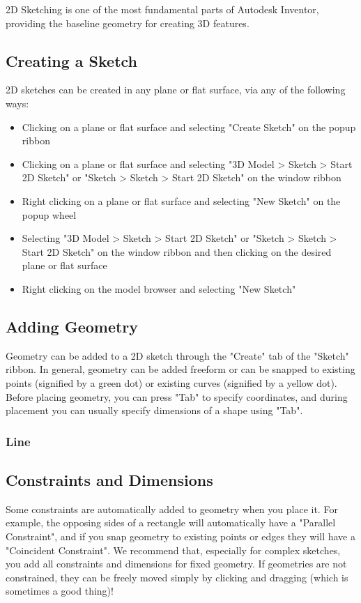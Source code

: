 \documentclass[a4paper,12pt]{report}
\begin{document}
2D Sketching is one of the most fundamental parts of Autodesk Inventor, providing the baseline geometry for creating 3D features. 

\subsection{Creating a Sketch}

2D sketches can be created in any plane or flat surface, via any of the following ways:

\begin{itemize}
\item Clicking on a plane or flat surface and selecting "Create Sketch" on the popup ribbon
\item Clicking on a plane or flat surface and selecting "3D Model > Sketch > Start 2D Sketch" or "Sketch > Sketch > Start 2D Sketch" on the window ribbon
\item Right clicking on a plane or flat surface and selecting "New Sketch" on the popup wheel
\item Selecting "3D Model > Sketch > Start 2D Sketch" or "Sketch > Sketch > Start 2D Sketch" on the window ribbon and then clicking on the desired plane or flat surface
\item Right clicking on the model browser and selecting "New Sketch"
\end{itemize}

\subsection{Adding Geometry}
Geometry can be added to a 2D sketch through the "Create" tab of the "Sketch" ribbon. In general, geometry can be added freeform or can be snapped to existing points (signified by a green dot) or existing curves (signified by a yellow dot). Before placing geometry, you can press "Tab" to specify coordinates, and during placement you can usually specify dimensions of a shape using "Tab". 
\subsubsection{Line}

\subsection{Constraints and Dimensions}
Some constraints are automatically added to geometry when you place it. For example, the opposing sides of a rectangle will automatically have a "Parallel Constraint", and if you snap geometry to existing points or edges they will have a "Coincident Constraint". We recommend that, especially for complex sketches, you add all constraints and dimensions for fixed geometry. If geometries are not constrained, they can be freely moved simply by clicking and dragging (which is sometimes a good thing)!
\end{document}
